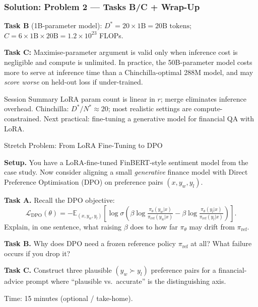 \documentclass[9pt,t]{beamer}
\begin{document}
\begin{frame}
\frametitle{Solution: Problem 2 --- Tasks B/C + Wrap-Up}

\textbf{Task B} (1B-parameter model):
$D^* = 20 \times 1\text{B} = 20\text{B tokens}$; $C = 6 \times 1\text{B} \times 20\text{B} = 1.2 \times 10^{23}$ FLOPs.

\medskip
\textbf{Task C:} Maximise-parameter argument is valid only when inference cost is
negligible and compute is unlimited.  In practice, the 50B-parameter model costs
more to serve at inference time than a Chinchilla-optimal 288M model, and may
\emph{score worse} on held-out loss if under-trained.

\medskip
\begin{block}{Session Summary}
  LoRA param count is linear in $r$; merge eliminates inference overhead.
  Chinchilla: $D^*/N^* \approx 20$; most realistic settings are compute-constrained.
  Next practical: fine-tuning a generative model for financial QA with LoRA.
\end{block}
\end{frame}


\begin{frame}[noframenumbering]{Stretch Problem: From LoRA Fine-Tuning to DPO}

\textbf{Setup.} You have a LoRA-fine-tuned FinBERT-style sentiment model from the
case study. Now consider aligning a small \emph{generative} finance model with
Direct Preference Optimisation (DPO) on preference pairs $(x, y_w, y_l)$.

\medskip
\textbf{Task A.} Recall the DPO objective:
\[
  \mathcal{L}_{\text{DPO}}(\theta) = -\mathbb{E}_{(x,y_w,y_l)}\!\left[
    \log \sigma\!\left(
      \beta \log \tfrac{\pi_\theta(y_w|x)}{\pi_{\text{ref}}(y_w|x)}
      - \beta \log \tfrac{\pi_\theta(y_l|x)}{\pi_{\text{ref}}(y_l|x)}
    \right)\right].
\]
Explain, in one sentence, what raising $\beta$ does to how far $\pi_\theta$ may drift
from $\pi_{\text{ref}}$.

\medskip
\textbf{Task B.} Why does DPO need a frozen reference policy $\pi_{\text{ref}}$ at all?
What failure occurs if you drop it?

\medskip
\textbf{Task C.} Construct three plausible $(y_w \succ y_l)$ preference pairs for a
financial-advice prompt where ``plausible vs.\ accurate'' is the distinguishing axis.

\medskip
\begin{block}{Time: 15 minutes (optional / take-home).}
\end{block}
\end{frame}
\end{document}
